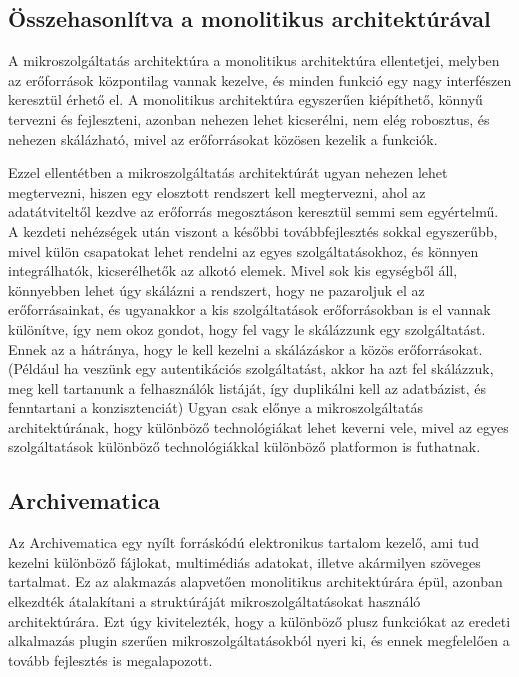 \documentclass[11pt,magyar,a4paper,twoside,]{report}
\begin{document}
\subsection{Összehasonlítva a monolitikus
architektúrával}\label{uxf6sszehasonluxedtva-a-monolitikus-architektuxfaruxe1val}

A mikroszolgáltatás architektúra a monolitikus architektúra ellentetjei,
melyben az erőforrások központilag vannak kezelve, és minden funkció egy
nagy interfészen keresztül érhető el. A monolitikus architektúra
egyszerűen kiépíthető, könnyű tervezni és fejleszteni, azonban nehezen
lehet kicserélni, nem elég robosztus, és nehezen skálázható, mivel az
erőforrásokat közösen kezelik a funkciók.

Ezzel ellentétben a mikroszolgáltatás architektúrát ugyan nehezen lehet
megtervezni, hiszen egy elosztott rendszert kell megtervezni, ahol az
adatátviteltől kezdve az erőforrás megosztáson keresztül semmi sem
egyértelmű. A kezdeti nehézségek után viszont a későbbi továbbfejlesztés
sokkal egyszerűbb, mivel külön csapatokat lehet rendelni az egyes
szolgáltatásokhoz, és könnyen integrálhatók, kicserélhetők az alkotó
elemek. Mivel sok kis egységből áll, könnyebben lehet úgy skálázni a
rendszert, hogy ne pazaroljuk el az erőforrásainkat, és ugyanakkor a kis
szolgáltatások erőforrásokban is el vannak különítve, így nem okoz
gondot, hogy fel vagy le skálázzunk egy szolgáltatást. Ennek az a
hátránya, hogy le kell kezelni a skálázáskor a közös
erőforrásokat.(Például ha veszünk egy autentikációs szolgáltatást, akkor
ha azt fel skálázzuk, meg kell tartanunk a felhasználók listáját, így
duplikálni kell az adatbázist, és fenntartani a konzisztenciát) Ugyan
csak előnye a mikroszolgáltatás architektúrának, hogy különböző
technológiákat lehet keverni vele, mivel az egyes szolgáltatások
különböző technológiákkal különböző platformon is futhatnak.

\subsection{Archivematica}\label{archivematica}

Az Archivematica\citep{archivematica} egy nyílt forráskódú elektronikus
tartalom kezelő, ami tud kezelni különböző fájlokat, multimédiás
adatokat, illetve akármilyen szöveges tartalmat. Ez az alakmazás
alapvetően monolitikus architektúrára épül, azonban elkezdték
átalakítani a struktúráját mikroszolgáltatásokat használó
architektúrára. Ezt úgy kivitelezték, hogy a különböző plusz funkciókat
az eredeti alkalmazás plugin szerűen mikroszolgáltatásokból nyeri ki, és
ennek megfelelően a tovább fejlesztés is
megalapozott\citep{archivematica-wiki}.
\end{document}
